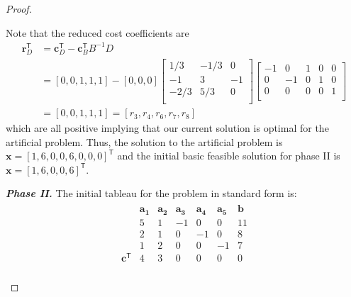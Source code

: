 \documentclass[12pt]{article}
\theoremstyle{definition}
\newcommand{\vect}[1]{\boldsymbol{#1}}
\newcommand{\tran}{\mathsf{T}}
\begin{document}
\begin{proof}
\begin{enumerate}
      Note that the reduced cost coefficients are
      \begin{align*}
        \vect{r}_D^\tran &= \vect{c}_D^\tran - \vect{c}_B^\tran B^{-1} D \\
        &= [0, 0, 1, 1, 1] - [0, 0, 0]
        \begin{bmatrix}
          1/3 & -1/3 & 0\\
          -1 & 3 & -1\\
          -2/3 & 5/3 & 0\\
        \end{bmatrix}
        \begin{bmatrix}
          -1 & 0 & 1 & 0 & 0\\
          0 & -1 & 0 & 1 & 0\\
          0 & 0 & 0 & 0 & 1\\
        \end{bmatrix} \\
        &= [0,0,1,1,1] = [r_3, r_4, r_6, r_7, r_8]
      \end{align*}
      which are all positive implying that our current solution is optimal for the artificial problem.
      Thus, the solution to the artificial problem is $\vect{x} = [1,6,0,0,6,0,0,0]^\tran$ and the initial
      basic feasible solution for phase II is $\vect{x} = [1,6,0,0,6]^\tran$.

      \textbf{\textit{Phase II.}} The initial tableau for the problem in standard form is:
      \begin{align*}
        \begin{matrix}
          & \vect{a_1} & \vect{a_2} & \vect{a_3} & \vect{a_4} & \vect{a_5} & \vect{b} \\
                         & 5 & 1 & -1 & 0 & 0 & 11 \\
                         & 2 & 1 & 0 & -1 & 0 & 8 \\
                         & 1 & 2 & 0 & 0 & -1 & 7 \\
          \vect{c}^\tran  & 4 & 3 & 0 & 0 & 0 & 0 \\
        \end{matrix}
      \end{align*}


\end{enumerate}
\end{proof}
\end{document}
